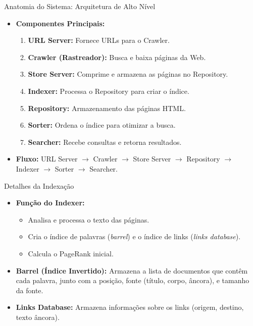 \documentclass{beamer}
\begin{document}
\begin{frame}{Anatomia do Sistema: Arquitetura de Alto Nível}
    \begin{itemize}
        \item \textbf{Componentes Principais:}
        \begin{enumerate}
            \item \textbf{URL Server:} Fornece URLs para o Crawler.
            \item \textbf{Crawler (Rastreador):} Busca e baixa páginas da Web.
            \item \textbf{Store Server:} Comprime e armazena as páginas no Repository.
            \item \textbf{Indexer:} Processa o Repository para criar o índice.
            \item \textbf{Repository:} Armazenamento das páginas HTML.
            \item \textbf{Sorter:} Ordena o índice para otimizar a busca.
            \item \textbf{Searcher:} Recebe consultas e retorna resultados.
        \end{enumerate}
        \item \textbf{Fluxo:} URL Server $\rightarrow$ Crawler $\rightarrow$ Store Server $\rightarrow$ Repository $\rightarrow$ Indexer $\rightarrow$ Sorter $\rightarrow$ Searcher.
    \end{itemize}
\end{frame}

\begin{frame}{Detalhes da Indexação}
    \begin{itemize}
        \item \textbf{Função do Indexer:}
        \begin{itemize}
            \item Analisa e processa o texto das páginas.
            \item Cria o índice de palavras (\textit{barrel}) e o índice de links (\textit{links database}).
            \item Calcula o PageRank inicial.
        \end{itemize}
        \item \textbf{Barrel (Índice Invertido):} Armazena a lista de documentos que contêm cada palavra, junto com a posição, fonte (título, corpo, âncora), e tamanho da fonte.
        \item \textbf{Links Database:} Armazena informações sobre os links (origem, destino, texto âncora).
    \end{itemize}
\end{frame}
\end{document}
